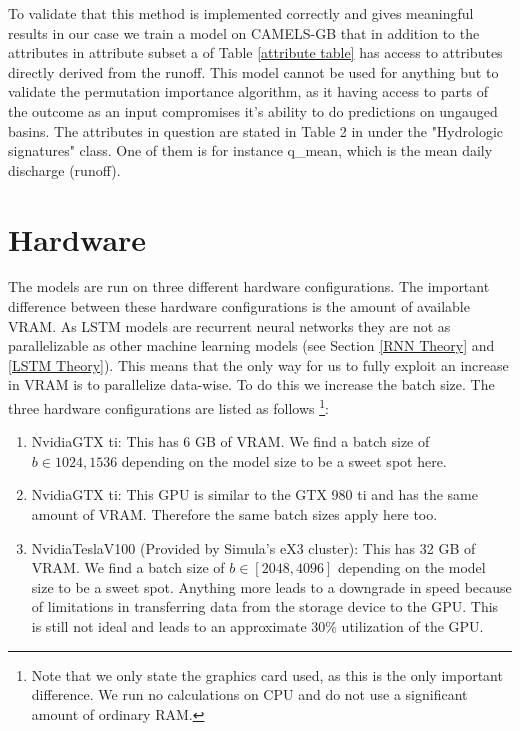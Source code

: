 To validate that this method is implemented correctly and gives meaningful results 
in our case we train a model on CAMELS-GB that in addition to the attributes in 
attribute subset a of Table \ref{attribute table} has access to attributes directly 
derived from the runoff. This model cannot be used for anything but to validate 
the permutation importance algorithm, as it having access to parts of the outcome as an input 
compromises it's ability to do predictions on ungauged basins.  The attributes in 
question are stated in Table 2 in \citet{CAMELS_GB} under the "Hydrologic signatures" 
class. One of them is for instance q\_mean, which is the mean daily discharge (runoff).
\section{Hardware}
The models are run on three different hardware configurations. The important difference 
between these hardware configurations is the amount of available VRAM. As LSTM models 
are recurrent neural networks they are not as parallelizable as other machine learning 
models (see Section \ref{RNN Theory} and \ref{LSTM Theory}). This means that the only way for us to fully exploit 
an increase in VRAM is to parallelize data-wise. To do this we increase the batch size.
The three hardware configurations are listed as follows \footnote{Note that we only 
state the graphics card used, as this is the only important difference. We run no 
calculations on CPU and do not use a significant amount of ordinary RAM.}:
\begin{enumerate}
    \item Nvidia\textregistered  GTX ti: This has 6 GB of VRAM. We find a batch size of $b\in{1024, 1536}$ 
     depending on the model size to be a sweet spot here.
    \item Nvidia\textregistered   GTX ti: This GPU is similar to the GTX 980 ti and has the 
        same amount of VRAM. Therefore the same batch sizes apply here too.
    \item Nvidia\textregistered   Tesla\texttrademark  V100 (Provided by Simula's eX3 cluster): This has 32 GB of VRAM. 
        We find a batch size of $b\in[2048,4096]$ depending on the model size
        to be a sweet spot. Anything more leads to a downgrade in speed because 
        of limitations in transferring data from the storage device to the GPU. 
        This is still not ideal and leads to an approximate 30\% utilization of the 
        GPU.
\end{enumerate}
